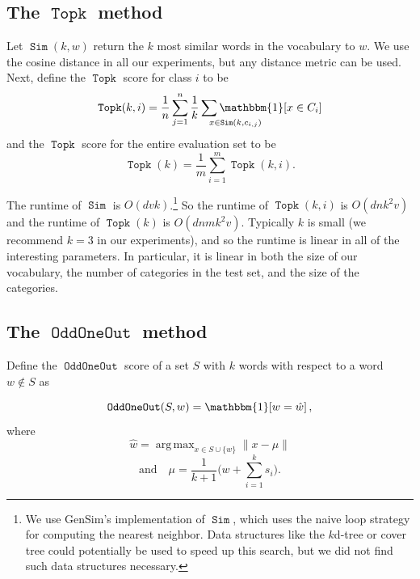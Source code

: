 \documentclass[11pt,a4paper]{article}
\newcommand{\ltwo}[1]{\lVert{#1}\rVert}
\newcommand{\indicator}[1]{\mathbbm{1}\!\left[{#1}\right]}
\DeclareMathOperator*{\argmax}{arg\,max}
\DeclareMathOperator{\FindMostSimilar}{\texttt{Sim}}
\DeclareMathOperator{\OddOneOut}{\texttt{OddOneOut}}
\DeclareMathOperator{\topk}{\texttt{Topk}}
\begin{document}
\subsection{The $\topk$ method}
Let $\FindMostSimilar(k,w)$ return the $k$ most similar words in the vocabulary to $w$.
We use the cosine distance in all our experiments,
but any distance metric can be used.
Next, define the $\topk$ score for class $i$ to be
\begin{equation}
    \topk(k,i) = \frac{1}{n}\sum_{j=1}^n \frac{1}{k}\sum_{\mathrlap{x \in \FindMostSimilar(k, c_{i,j})}} \indicator{x \in C_i}
\end{equation}
and the $\topk$ score for the entire evaluation set to be
\begin{equation}
    \topk(k) = \frac{1}{m}\sum_{i=1}^m \topk(k,i)
    .
\end{equation}

The runtime of $\FindMostSimilar$ is $O(dvk)$.\footnote{
    We use GenSim's implementation of $\FindMostSimilar$,
    which uses the naive loop strategy for computing the nearest neighbor.
    Data structures like the $k$d-tree or cover tree could potentially be used to speed up this search,
    but we did not find such data structures necessary.
}
So the runtime of $\topk(k,i)$ is $O(dnk^2v)$
and the runtime of $\topk(k)$ is $O(dnmk^2v)$.
Typically $k$ is small (we recommend $k=3$ in our experiments),
and so the runtime is linear in all of the interesting parameters.
In particular, it is linear in both the size of our vocabulary, the number of categories in the test set, and the size of the categories.

\subsection{The $\OddOneOut$ method}
Define the $\OddOneOut$ score of a set $S$ with $k$ words with respect to a word $w\not\in S$ as


\begin{equation}
    \OddOneOut(S,w) = \indicator{w = \hat w},
\end{equation}
where
\begin{equation}
    \hat w = \argmax_{x \in S\cup\{w\}} \ltwo{x - \mu}
\end{equation}
\begin{equation}
    \text{and}
    \quad
    \mu = \frac1{k+1}\bigg(w + \sum_{i=1}^k{s_i}\bigg)
    .
\end{equation}
\end{document}
